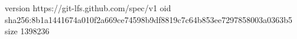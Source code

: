 version https://git-lfs.github.com/spec/v1
oid sha256:8b1a1441674a010f2a669ce74598b9df8819c7c64b853ee7297858003a0363b5
size 1398236
